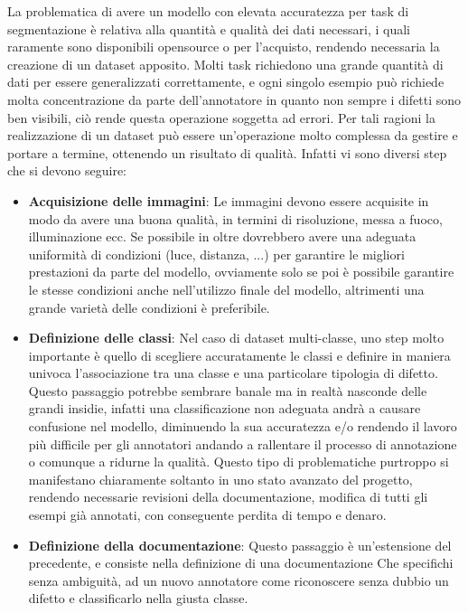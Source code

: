 La problematica di avere un modello con elevata accuratezza per task di segmentazione è relativa alla quantità e qualità dei dati necessari,
i quali raramente sono disponibili opensource o per l'acquisto, rendendo necessaria la creazione di un dataset apposito.
Molti task richiedono una grande quantità di dati per essere generalizzati correttamente, e ogni singolo esempio può richiede molta concentrazione
da parte dell'annotatore in quanto non sempre i difetti sono ben visibili, ciò rende questa operazione soggetta ad errori. 
Per tali ragioni la realizzazione di un dataset può essere un'operazione molto complessa da gestire e portare a termine, ottenendo un
risultato di qualità.
Infatti vi sono diversi step che si devono seguire:
\begin{itemize}
    \item \textbf{Acquisizione delle immagini}: Le immagini devono essere acquisite in modo da avere una buona qualità, in termini di risoluzione, messa a fuoco, illuminazione ecc.
        Se possibile in oltre dovrebbero avere una adeguata uniformità di condizioni (luce, distanza, ...) per garantire le migliori prestazioni da parte del modello,
        ovviamente solo se poi è possibile garantire le stesse condizioni anche nell'utilizzo finale del modello, altrimenti una grande varietà delle condizioni
        è preferibile.
    \item \textbf{Definizione delle classi}: Nel caso di dataset multi-classe, uno step molto importante è quello di scegliere accuratamente le classi
        e definire in maniera univoca l'associazione tra una classe e una particolare tipologia di difetto. Questo passaggio potrebbe sembrare banale ma in realtà
        nasconde delle grandi insidie, infatti una classificazione non adeguata andrà a causare confusione nel modello, diminuendo la sua accuratezza e/o 
        rendendo il lavoro più difficile per gli annotatori andando a rallentare il processo di annotazione o comunque a ridurne la qualità.
        Questo tipo di problematiche purtroppo si manifestano chiaramente soltanto in uno stato avanzato del progetto,
        rendendo necessarie revisioni della documentazione, modifica di tutti gli esempi già annotati, con conseguente perdita di tempo e denaro.
    \item \textbf{Definizione della documentazione}: Questo passaggio è un'estensione del precedente, e consiste nella definizione di una documentazione
        Che specifichi senza ambiguità, ad un nuovo annotatore come riconoscere senza dubbio un difetto e classificarlo nella giusta classe.

\end{itemize}
